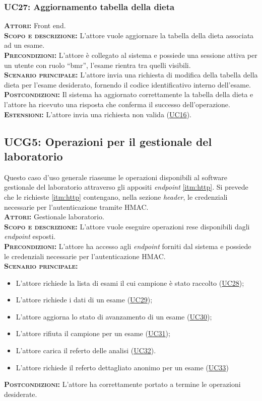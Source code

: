 \subsubsection{UC27: Aggiornamento tabella della dieta}
\label{sec:UC27}
\textsc{\textbf{Attori:}} Front end.\\
\textsc{\textbf{Scopo e descrizione:}} L'attore vuole aggiornare la tabella della dieta associata ad un esame.\\
\textsc{\textsc{\textbf{Precondizioni:}}} L'attore è collegato al sistema e possiede una sessione attiva per un utente con ruolo ``bmr'', l'esame rientra tra quelli visibili.\\
\textsc{\textbf{Scenario principale:}}  L'attore invia una richiesta di modifica della tabella della dieta per l'esame desiderato, fornendo il codice identificativo interno dell'esame.\\
\textsc{\textbf{Postcondizioni:}} Il sistema ha aggiornato correttamente la tabella della dieta e l'attore ha ricevuto una risposta che conferma il successo dell'operazione.\\
\textsc{\textbf{Estensioni:}} L'attore invia una richiesta non valida (\hyperref[sec:UC16]{UC16}).

\subsection{UCG5: Operazioni per il gestionale del laboratorio}
\label{sec:UCG5}
Questo caso d'uso generale riassume le operazioni disponibili al software gestionale del laboratorio attraverso gli appositi \textit{endpoint} \ref{itm:http}. Si prevede che le richieste \ref{itm:http} contengano, nella sezione \textit{header}, le credenziali necessarie per l'autenticazione tramite HMAC.\\ 
\textsc{\textbf{Attori:}} Gestionale laboratorio.\\
\textsc{\textbf{Scopo e descrizione:}} L'attore vuole eseguire operazioni rese disponibili dagli \textit{endpoint} esposti.\\
\textsc{\textbf{Precondizioni:}} L'attore ha accesso agli \textit{endpoint} forniti dal sistema e possiede le credenziali necessarie per l'autenticazione HMAC.\\
\textsc{\textbf{Scenario principale:}} 
\begin{itemize}
    \item L'attore richiede la lista di esami il cui campione è stato raccolto (\hyperref[sec:UC28]{UC28});
    \item L'attore richiede i dati di un esame (\hyperref[sec:UC29]{UC29});
    \item L'attore aggiorna lo stato di avanzamento di un esame (\hyperref[sec:UC30]{UC30});
    \item L'attore rifiuta il campione per un esame (\hyperref[sec:UC31]{UC31});
    \item L'attore carica il referto delle analisi (\hyperref[sec:UC32]{UC32}).
    \item L'attore richiede il referto dettagliato anonimo per un esame (\hyperref[sec:UC33]{UC33})
\end{itemize}
\textsc{\textbf{Postcondizioni:}} L'attore ha correttamente portato a termine le operazioni desiderate.

